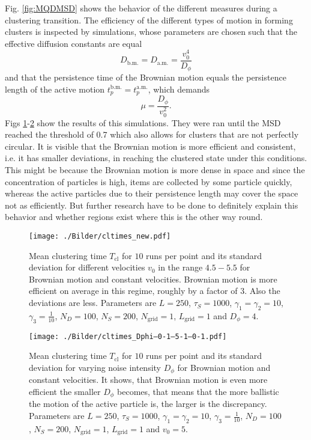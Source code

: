 Fig. \ref{fig:MQDMSD} shows the behavior of the different measures during a clustering transition.
The efficiency of the different types of motion in forming clusters is inspected by simulations, whose parameters are chosen such that the effective diffusion constants are equal
%
\begin{equation}
D_\text{b.m.} = D_\text{a.m.} = \frac{v_0^4}{D_\phi}	
\end{equation}
%
and that the persistence time of the Brownian motion equals the persistence length of the active motion $t_p^{\text{b.m.}}=t_p^{\text{a.m.}}$, which demands
%
\begin{equation}
	\mu = \frac{D_\phi}{v_0^2}.
\label{eq:muD_SD}
\end{equation}
%
Figs \ref{fig:Tcl_v}-\ref{fig:Tcl_Dphi} show the results of this simulations.
They were ran until the MSD reached the threshold of 0.7 which also allows for clusters that are not perfectly circular.
It is visible that the Brownian motion is more efficient and consistent, i.e. it has smaller deviations, in reaching the clustered state under this conditions.
This might be because the Brownian motion is more dense in space and since the concentration of particles is high, items are collected by some particle quickly, whereas the active particles due to their persistence length may cover the space not as efficiently.
But further research have to be done to definitely explain this behavior and whether regions exist where this is the other way round.

%
\begin{figure}[H]
\centering
  \texttt{[image: ./Bilder/cltimes\_new.pdf]}
\caption{
    Mean clustering time $T_\text{cl}$ for $10$ runs per point and its standard deviation for different velocities $v_0$ in the range $4.5-5.5$ for Brownian motion and constant velocities.
    Brownian motion is more efficient on average in this regime, roughly by a factor of $3$.
    Also the deviations are less.
    Parameters are $L=250$, $\tau_S=1000$, $\gamma_1=\gamma_2=10$, $\gamma_3=\frac{1}{10}$, $N_D=100$, $N_S=200$, $N_\text{grid}=1$, $L_\text{grid}=1$ and $D_\phi=4$.
}
\label{fig:Tcl_v}
\end{figure}
%
\begin{figure}[H]
\centering
  \texttt{[image: ./Bilder/cltimes\_Dphi--0-1--5-1--0-1.pdf]}
\caption{
    Mean clustering time $T_\text{cl}$ for $10$ runs per point and its standard deviation for varying noise intensity $D_\phi$ for Brownian motion and constant velocities.
    It shows, that Brownian motion is even more efficient the smaller $D_\phi$ becomes, that means that the more ballistic the motion of the active particle is, the larger is the discrepancy.
    Parameters are $L=250$, $\tau_S=1000$, $\gamma_1=\gamma_2=10$, $\gamma_3=\frac{1}{10}$, $N_D=100$, $N_S=200$, $N_\text{grid}=1$, $L_\text{grid}=1$ and $v_0=5$.
}
\label{fig:Tcl_Dphi}
\end{figure}

